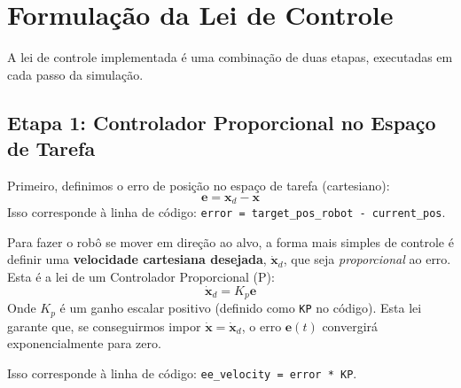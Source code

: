 \documentclass[a4paper, 12pt]{article}
\begin{document}
\section{Formulação da Lei de Controle}
A lei de controle implementada é uma combinação de duas etapas, executadas em cada passo da simulação.

\subsection{Etapa 1: Controlador Proporcional no Espaço de Tarefa}
Primeiro, definimos o erro de posição no espaço de tarefa (cartesiano):
\begin{equation}
\mathbf{e} = \mathbf{x}_d - \mathbf{x}
\label{eq:erro}
\end{equation}
Isso corresponde à linha de código: \texttt{error = target\_pos\_robot - current\_pos}.

Para fazer o robô se mover em direção ao alvo, a forma mais simples de controle é definir uma \textbf{velocidade cartesiana desejada}, $\dot{\mathbf{x}}_d$, que seja \textit{proporcional} ao erro. Esta é a lei de um Controlador Proporcional (P):
\begin{equation}
\dot{\mathbf{x}}_d = K_p \mathbf{e}
\label{eq:p_control}
\end{equation}
Onde $K_p$ é um ganho escalar positivo (definido como \texttt{KP} no código). Esta lei garante que, se conseguirmos impor $\dot{\mathbf{x}} = \dot{\mathbf{x}}_d$, o erro $\mathbf{e}(t)$ convergirá exponencialmente para zero.

Isso corresponde à linha de código: \texttt{ee\_velocity = error * KP}.
\end{document}
